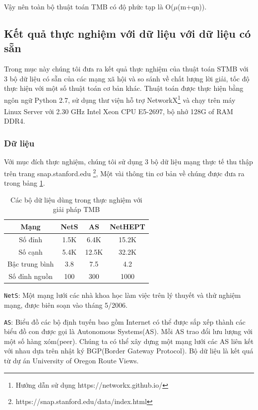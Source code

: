 Vậy nên toàn bộ thuật toán TMB có độ phức tạp là O($\mu$(m+qn)).

\subsection{Kết quả thực nghiệm với dữ liệu với dữ liệu có sẵn}	

Trong mục này chúng tôi đưa ra kết quả thực nghiệm của thuật toán STMB với 3 bộ dữ liệu có sẵn của các mạng xã hội và so sánh về chất lượng lời giải, tốc độ thực hiện với một số thuật toán cơ bản khác.
Thuật toán được thực hiện bằng ngôn ngữ Python 2.7, sử dụng thư viện hỗ trợ NetworkX\footnote{Hướng dẫn sử dụng https://networkx.github.io/} và chạy trên máy Linux Server với 2.30 GHz Intel\textsuperscript{\textregistered} Xeon\textsuperscript{\textregistered} CPU E5-2697, bộ nhớ 128G of RAM DDR4.
\subsubsection{Dữ liệu}
Với mục đích thực nghiệm, chúng tôi sử dụng 3 bộ dữ liệu mạng thực tế thu thập trên trang snap.stanford.edu \footnote{https://snap.stanford.edu/data/index.html}, Một vài thông tin cơ bản về chúng được đưa ra trong bảng \ref{TMB:table}. 
\begin{table}[h]
	\centering
	\begin{tabular}{|c|c|c|c|}
		\hline 
		Mạng & NetS & AS & NetHEPT\\ 
		\hline 
		Số đỉnh & 1.5K & 6.4K & 15.2K \\ 
		\hline 
		Số cạnh & 5.4K & 12.5K & 32.2K\\ 
		\hline 
		Bậc trung bình & 3.8 & 7.5 & 4.2\\ 
		\hline 
		Số đỉnh nguồn & 100 & 300 & 1000\\ 
		\hline 
	\end{tabular} 
	\caption{Các bộ dữ liệu dùng trong thực nghiệm với giải pháp TMB}
	\label{TMB:table}
\end{table}

\texttt{NetS}\cite{NetS}: Một mạng lưới các nhà khoa học làm việc trên lý thuyết và thử nghiệm mạng, được biên soạn vào tháng 5/2006.

\texttt{AS}\cite{AS}: Biểu đồ các bộ định tuyến bao gồm Internet có thể được sắp xếp thành các biểu đồ con được gọi là Autonomous Systems(AS). Mỗi AS trao đổi lưu lượng với một số hàng xóm(peer). Chúng ta có thể xây dựng một mạng lưới các AS liên kết với nhau dựa trên nhật ký BGP(Border Gateway Protocol). Bộ dữ liệu là kết quá từ dự án University of Oregon Route Views. 

